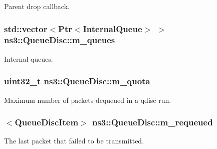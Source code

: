 Parent drop callback. 

\subsubsection[{\texorpdfstring{m\+\_\+queues}{m_queues}}]{\setlength{\rightskip}{0pt plus 5cm}std\+::vector$<${\bf Ptr}$<${\bf Internal\+Queue}$>$ $>$ ns3\+::\+Queue\+Disc\+::m\+\_\+queues\hspace{0.3cm}{\ttfamily [private]}}\hypertarget{classns3_1_1QueueDisc_ae6507c7002e15afd8944a34f239331d7}{}\label{classns3_1_1QueueDisc_ae6507c7002e15afd8944a34f239331d7}


Internal queues. 

\subsubsection[{\texorpdfstring{m\+\_\+quota}{m_quota}}]{\setlength{\rightskip}{0pt plus 5cm}uint32\+\_\+t ns3\+::\+Queue\+Disc\+::m\+\_\+quota\hspace{0.3cm}{\ttfamily [private]}}\hypertarget{classns3_1_1QueueDisc_a4f7e8c8503be408b6bbf82e0648c9fc8}{}\label{classns3_1_1QueueDisc_a4f7e8c8503be408b6bbf82e0648c9fc8}


Maximum number of packets dequeued in a qdisc run. 

\subsubsection[{\texorpdfstring{m\+\_\+requeued}{m_requeued}}]{$<${\bf Queue\+Disc\+Item}$>$ ns3\+::\+Queue\+Disc\+::m\+\_\+requeued\hspace{0.3cm}{\ttfamily [private]}}\hypertarget{classns3_1_1QueueDisc_a43cae3d282e28914b1b5e1b782c7e854}{}\label{classns3_1_1QueueDisc_a43cae3d282e28914b1b5e1b782c7e854}


The last packet that failed to be transmitted. 

